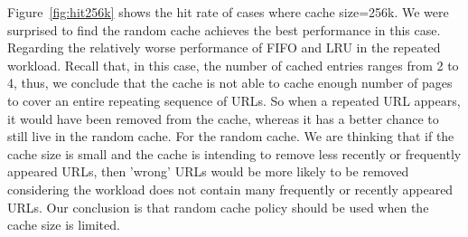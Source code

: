 \documentclass[paper=a4, fontsize=11pt]{scrartcl} %
\numberwithin{equation}{section} %
\numberwithin{figure}{section} %
\numberwithin{table}{section} %
\begin{document}
\vspace{1em}

Figure~\ref{fig:hit256k} shows the hit rate of cases where cache size=256k. We were surprised to find the random cache achieves the best performance in this case. Regarding the relatively worse performance of FIFO and LRU in the repeated workload. Recall that, in this case, the number of cached 
entries ranges from 2 to 4, thus, we conclude that the cache is not able to cache enough number of pages to cover an entire repeating sequence of URLs. So when a repeated URL appears, it would have been removed from the cache, whereas it has a better chance to still live in the random cache. For the random cache. We are thinking that if the cache size is small and the cache is intending to remove less recently or frequently appeared URLs, then 'wrong' URLs would be more likely to be removed considering the workload does not contain many frequently or recently appeared URLs. Our conclusion is that random cache policy should be used when the cache size is limited.    

\vspace{1em}
\end{document}
